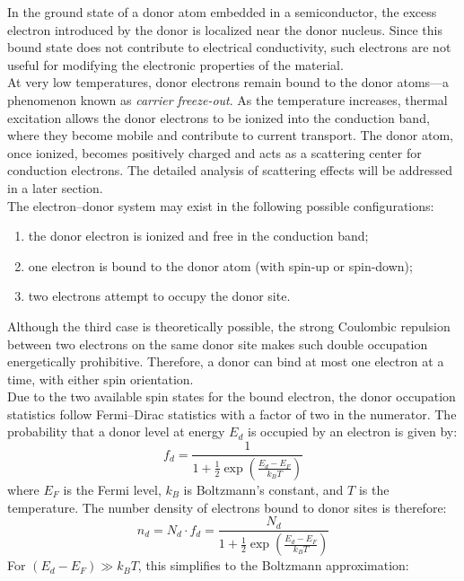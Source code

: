 In the ground state of a donor atom embedded in a semiconductor, the excess electron introduced by the donor is localized near the donor nucleus. Since this bound state does not contribute to electrical conductivity, such electrons are not useful for modifying the electronic properties of the material.\\
At very low temperatures, donor electrons remain bound to the donor atoms—a phenomenon known as \textit{carrier freeze-out}. As the temperature increases, thermal excitation allows the donor electrons to be ionized into the conduction band, where they become mobile and contribute to current transport. The donor atom, once ionized, becomes positively charged and acts as a scattering center for conduction electrons. The detailed analysis of scattering effects will be addressed in a later section.\\
The electron–donor system may exist in the following possible configurations:
\begin{enumerate}
	\item the donor electron is ionized and free in the conduction band;
	\item one electron is bound to the donor atom (with spin-up or spin-down);
	\item two electrons attempt to occupy the donor site.
\end{enumerate}
Although the third case is theoretically possible, the strong Coulombic repulsion between two electrons on the same donor site makes such double occupation energetically prohibitive. Therefore, a donor can bind at most one electron at a time, with either spin orientation.\\
Due to the two available spin states for the bound electron, the donor occupation statistics follow Fermi–Dirac statistics with a factor of two in the numerator. The probability that a donor level at energy \( E_d \) is occupied by an electron is given by:
\begin{equation}
	f_d = \frac{1}{1 + \frac{1}{2} \exp\left( \frac{E_d - E_F}{k_B T} \right)}
\end{equation}
\noindent
where \( E_F \) is the Fermi level, \( k_B \) is Boltzmann’s constant, and \( T \) is the temperature.
The number density of electrons bound to donor sites is therefore:
\begin{equation}
	n_d = N_d \cdot f_d = \frac{N_d}{1 + \frac{1}{2} \exp\left( \frac{E_d - E_F}{k_B T} \right)}
\end{equation}
\noindent
For \( (E_d - E_F) \gg k_B T \), this simplifies to the Boltzmann approximation:
